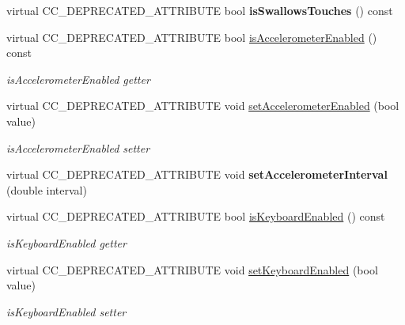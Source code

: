 \begin{DoxyCompactItemize}
\item 
\mbox{\label{classLayer_ae60fcfbe2cef9673df35eaab0c3b96f4}} 
virtual C\+C\+\_\+\+D\+E\+P\+R\+E\+C\+A\+T\+E\+D\+\_\+\+A\+T\+T\+R\+I\+B\+U\+TE bool {\bfseries is\+Swallows\+Touches} () const
\item 
virtual C\+C\+\_\+\+D\+E\+P\+R\+E\+C\+A\+T\+E\+D\+\_\+\+A\+T\+T\+R\+I\+B\+U\+TE bool \hyperlink{classLayer_ab9ea31abf3231b9a5086173228df9e46}{is\+Accelerometer\+Enabled} () const
\begin{DoxyCompactList}\small\item\em is\+Accelerometer\+Enabled getter \end{DoxyCompactList}\item 
\mbox{\label{classLayer_aff2ed49cc6dd60b437e6a08dde222b08}} 
virtual C\+C\+\_\+\+D\+E\+P\+R\+E\+C\+A\+T\+E\+D\+\_\+\+A\+T\+T\+R\+I\+B\+U\+TE void \hyperlink{classLayer_aff2ed49cc6dd60b437e6a08dde222b08}{set\+Accelerometer\+Enabled} (bool value)
\begin{DoxyCompactList}\small\item\em is\+Accelerometer\+Enabled setter \end{DoxyCompactList}\item 
\mbox{\label{classLayer_a9ad96822c08ca52ec325fd425a8998ad}} 
virtual C\+C\+\_\+\+D\+E\+P\+R\+E\+C\+A\+T\+E\+D\+\_\+\+A\+T\+T\+R\+I\+B\+U\+TE void {\bfseries set\+Accelerometer\+Interval} (double interval)
\item 
virtual C\+C\+\_\+\+D\+E\+P\+R\+E\+C\+A\+T\+E\+D\+\_\+\+A\+T\+T\+R\+I\+B\+U\+TE bool \hyperlink{classLayer_a038e7b38bbd680609a6c05604971bebb}{is\+Keyboard\+Enabled} () const
\begin{DoxyCompactList}\small\item\em is\+Keyboard\+Enabled getter \end{DoxyCompactList}\item 
\mbox{\label{classLayer_aa1c10581f33e5c7cfdefa79e961e3f21}} 
virtual C\+C\+\_\+\+D\+E\+P\+R\+E\+C\+A\+T\+E\+D\+\_\+\+A\+T\+T\+R\+I\+B\+U\+TE void \hyperlink{classLayer_aa1c10581f33e5c7cfdefa79e961e3f21}{set\+Keyboard\+Enabled} (bool value)
\begin{DoxyCompactList}\small\item\em is\+Keyboard\+Enabled setter \end{DoxyCompactList}\item 

\end{DoxyCompactItemize}
